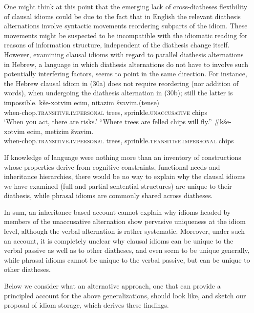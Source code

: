 \documentclass[output=paper,
modfonts
]{LSP/langsci}
\begin{document}
One might think at this point that the emerging lack of cross-diatheses
flexibility of clausal idioms could be due to the fact that in English
the relevant diathesis alternations involve syntactic movements
reordering subparts of the idiom. These movements might be suspected to
be incompatible with the idiomatic reading for reasons of information
structure, independent of the diathesis change itself. However,
examining clausal idioms with regard to parallel diathesis alternations
in Hebrew, a language in which diathesis alternations do not have to
involve such potentially interfering factors, seems to point in the same
direction. For instance, the Hebrew clausal idiom in (30a) does not
require reordering (nor addition of words), when undergoing the
diathesis alternation in (30b); still the latter is impossible.
\ea
	\ea \gll kše-xotvim ecim, nitazim švavim.\hfill (tense)\\
	when-chop.\textsc{transitive.impersonal} trees, sprinkle.\textsc{unaccusative} chips\\
	\glt `When you act, there are risks.' ``Where trees are felled chips will fly.''
	\ex \gll \#kše-xotvim ecim, metizim švavim.\\
	when-chop.\textsc{transitive.impersonal} trees, sprinkle.\textsc{transitive.impersonal} chips\\
	\z
\z

If knowledge of language were nothing more than an inventory of
constructions whose properties derive from cognitive constraints,
functional needs and inheritance hierarchies, there would be no way to
explain why the clausal idioms we have examined (full and partial
sentential structures) are unique to their diathesis, while phrasal
idioms are commonly shared across diatheses.

In sum, an inheritance-based account cannot explain why idioms headed by
members of the unaccusative alternation show pervasive uniqueness at the
idiom level, although the verbal alternation is rather systematic.
Moreover, under such an account, it is completely unclear why clausal
idioms can be unique to the verbal passive as well as to other
diatheses, and even seem to be unique generally, while phrasal idioms
cannot be unique to the verbal passive, but can be unique to other
diatheses.

Below we consider what an alternative approach, one that can provide a
principled account for the above generalizations, should look like, and
sketch our proposal of idiom storage, which derives these findings.
\end{document}
